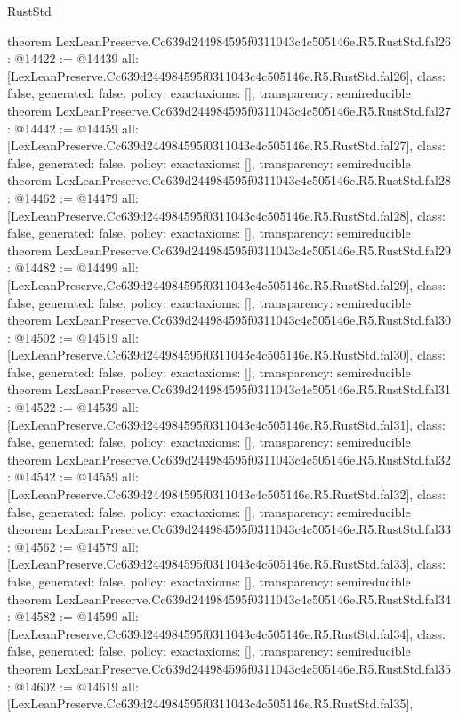 \begin{lexlean}{RustStd}
\begin{coremodule}
{}
theorem LexLeanPreserve.Cc639d244984595f0311043c4c505146e.R5.RustStd.fal26 : @14422 := @14439 {
  all: [LexLeanPreserve.Cc639d244984595f0311043c4c505146e.R5.RustStd.fal26],
  class: false,
  generated: false,
  policy: exact{axioms: []},
  transparency: semireducible
}
theorem LexLeanPreserve.Cc639d244984595f0311043c4c505146e.R5.RustStd.fal27 : @14442 := @14459 {
  all: [LexLeanPreserve.Cc639d244984595f0311043c4c505146e.R5.RustStd.fal27],
  class: false,
  generated: false,
  policy: exact{axioms: []},
  transparency: semireducible
}
theorem LexLeanPreserve.Cc639d244984595f0311043c4c505146e.R5.RustStd.fal28 : @14462 := @14479 {
  all: [LexLeanPreserve.Cc639d244984595f0311043c4c505146e.R5.RustStd.fal28],
  class: false,
  generated: false,
  policy: exact{axioms: []},
  transparency: semireducible
}
theorem LexLeanPreserve.Cc639d244984595f0311043c4c505146e.R5.RustStd.fal29 : @14482 := @14499 {
  all: [LexLeanPreserve.Cc639d244984595f0311043c4c505146e.R5.RustStd.fal29],
  class: false,
  generated: false,
  policy: exact{axioms: []},
  transparency: semireducible
}
theorem LexLeanPreserve.Cc639d244984595f0311043c4c505146e.R5.RustStd.fal30 : @14502 := @14519 {
  all: [LexLeanPreserve.Cc639d244984595f0311043c4c505146e.R5.RustStd.fal30],
  class: false,
  generated: false,
  policy: exact{axioms: []},
  transparency: semireducible
}
theorem LexLeanPreserve.Cc639d244984595f0311043c4c505146e.R5.RustStd.fal31 : @14522 := @14539 {
  all: [LexLeanPreserve.Cc639d244984595f0311043c4c505146e.R5.RustStd.fal31],
  class: false,
  generated: false,
  policy: exact{axioms: []},
  transparency: semireducible
}
theorem LexLeanPreserve.Cc639d244984595f0311043c4c505146e.R5.RustStd.fal32 : @14542 := @14559 {
  all: [LexLeanPreserve.Cc639d244984595f0311043c4c505146e.R5.RustStd.fal32],
  class: false,
  generated: false,
  policy: exact{axioms: []},
  transparency: semireducible
}
theorem LexLeanPreserve.Cc639d244984595f0311043c4c505146e.R5.RustStd.fal33 : @14562 := @14579 {
  all: [LexLeanPreserve.Cc639d244984595f0311043c4c505146e.R5.RustStd.fal33],
  class: false,
  generated: false,
  policy: exact{axioms: []},
  transparency: semireducible
}
theorem LexLeanPreserve.Cc639d244984595f0311043c4c505146e.R5.RustStd.fal34 : @14582 := @14599 {
  all: [LexLeanPreserve.Cc639d244984595f0311043c4c505146e.R5.RustStd.fal34],
  class: false,
  generated: false,
  policy: exact{axioms: []},
  transparency: semireducible
}
theorem LexLeanPreserve.Cc639d244984595f0311043c4c505146e.R5.RustStd.fal35 : @14602 := @14619 {
  all: [LexLeanPreserve.Cc639d244984595f0311043c4c505146e.R5.RustStd.fal35],
}
\end{coremodule}
\end{lexlean}
